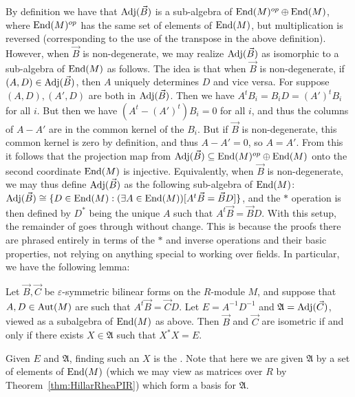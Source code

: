 \begin{enumerate}
By definition we have that $\text{Adj}(\vec{B})$ is a sub-algebra of $\mathrm{End}(M)^{op} \oplus \mathrm{End}(M)$, where $\mathrm{End}(M)^{op}$ has the same set of elements of $\mathrm{End}(M)$, but multiplication is reversed (corresponding to the use of the transpose in the above definition). However, when $\vec{B}$ is non-degenerate, we may realize $\text{Adj}(\vec{B})$ as isomorphic to a sub-algebra of $\mathrm{End}(M)$ as follows. The idea is that when $\vec{B}$ is non-degenerate, if $(A,D) \in \text{Adj}(\vec{B})$, then $A$ uniquely determines $D$ and vice versa. For suppose $(A,D), (A',D)$ are both in $\text{Adj}(\vec{B})$. Then we have $A^t B_i = B_i D = (A')^t B_i$ for all $i$. But then we have $(A^t - (A')^t)B_i = 0$ for all $i$, and thus the columns of $A - A'$ are in the common kernel of the $B_i$. But if $\vec{B}$ is non-degenerate, this common kernel is zero by definition, and thus $A - A' = 0$, so $A = A'$. From this it follows that the projection map from $\text{Adj}(\vec{B}) \subseteq \mathrm{End}(M)^{op} \oplus \mathrm{End}(M)$ onto the second coordinate $\mathrm{End}(M)$ is injective. Equivalently, when $\vec{B}$ is non-degenerate, we may thus define $\text{Adj}(\vec{B})$ as the following sub-algebra of $\mathrm{End}(M)$: $\text{Adj}(\vec{B}) \cong \{D \in \mathrm{End}(M) : (\exists A \in \mathrm{End}(M))[A^t \vec{B} = \vec{B} D]\}$, and the $*$ operation is then defined by $D^*$ being the unique $A$ such that $A^t \vec{B} = \vec{B} D$. With this setup, the remainder of \cite[Sec.~3.4]{IQ19} goes through without change. This is because the proofs there are phrased entirely in terms of the $*$ and inverse operations and their basic properties, not relying on anything special to working over fields. In particular, we have the following lemma:

\begin{lemma}[{Cf. \cite[Prop.~3.4]{IQ19}}]
Let $\vec{B}, \vec{C}$ be $\varepsilon$-symmetric bilinear forms on the $R$-module $M$, and suppose that $A,D \in \mathrm{Aut}(M)$ are such that $A^t \vec{B} = \vec{C} D$. Let $E = A^{-1} D^{-1}$ and $\mathfrak{A} = \text{Adj}(\vec{C})$, viewed as a subalgebra of $\mathrm{End}(M)$ as above. Then $\vec{B}$ and $\vec{C}$ are isometric if and only if there exists $X \in \mathfrak{A}$ such that $X^* X = E$.
\end{lemma}

Given $E$ and $\mathfrak{A}$, finding such an $X$ is the . Note that here we are given $\mathfrak{A}$ by a set of elements of $\mathrm{End}(M)$ (which we may view as matrices over $R$ by Theorem~\ref{thm:HillarRheaPIR}) which form a basis for $\mathfrak{A}$.  


\end{enumerate}
